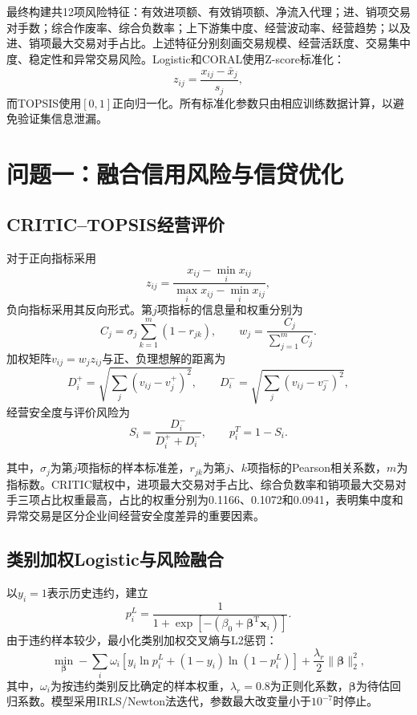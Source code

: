 \documentclass[UTF8,a4paper,12pt,fontset=fandol]{ctexart}
\numberwithin{equation}{section}
\begin{document}
最终构建共12项风险特征：有效进项额、有效销项额、净流入代理；进、销项交易对手数；综合作废率、综合负数率；上下游集中度、经营波动率、经营趋势；以及进、销项最大交易对手占比。上述特征分别刻画交易规模、经营活跃度、交易集中度、稳定性和异常交易风险。Logistic和CORAL使用Z-score标准化：
\begin{equation}
z_{ij}=\frac{x_{ij}-\bar x_j}{s_j},
\end{equation}
而TOPSIS使用$[0,1]$正向归一化。所有标准化参数只由相应训练数据计算，以避免验证集信息泄漏。

\section{问题一：融合信用风险与信贷优化}

\subsection{CRITIC--TOPSIS经营评价}

对于正向指标采用
\begin{equation}
z_{ij}=\frac{x_{ij}-\min_i x_{ij}}{\max_i x_{ij}-\min_i x_{ij}},
\end{equation}
负向指标采用其反向形式。第$j$项指标的信息量和权重分别为
\begin{equation}
C_j=\sigma_j\sum_{k=1}^{m}(1-r_{jk}),\qquad
w_j=\frac{C_j}{\sum_{j=1}^{m}C_j}.
\end{equation}
加权矩阵$v_{ij}=w_jz_{ij}$与正、负理想解的距离为
\begin{equation}
D_i^+=\sqrt{\sum_j(v_{ij}-v_j^+)^2},\qquad
D_i^-=\sqrt{\sum_j(v_{ij}-v_j^-)^2},
\end{equation}
经营安全度与评价风险为
\begin{equation}
S_i=\frac{D_i^-}{D_i^++D_i^-},\qquad p_i^T=1-S_i.
\end{equation}

其中，$\sigma_j$为第$j$项指标的样本标准差，$r_{jk}$为第$j$、$k$项指标的Pearson相关系数，$m$为指标数。CRITIC赋权中，进项最大交易对手占比、综合负数率和销项最大交易对手三项占比权重最高，占比的权重分别为0.1166、0.1072和0.0941，表明集中度和异常交易是区分企业间经营安全度差异的重要因素。

\subsection{类别加权Logistic与风险融合}

以$y_i=1$表示历史违约，建立
\begin{equation}
p_i^L=\frac{1}{1+\exp[-(\beta_0+\bm\beta^{\mathrm T}\bm x_i)]}.
\end{equation}
由于违约样本较少，最小化类别加权交叉熵与L2惩罚：
\begin{equation}
\min_{\bm\beta}-\sum_i\omega_i[y_i\ln p_i^L+(1-y_i)\ln(1-p_i^L)]
+\frac{\lambda_r}{2}\|\bm\beta\|_2^2,
\end{equation}
其中，$\omega_i$为按违约类别反比确定的样本权重，$\lambda_r=0.8$为正则化系数，$\bm\beta$为待估回归系数。模型采用IRLS/Newton法迭代，参数最大改变量小于$10^{-7}$时停止。
\end{document}

